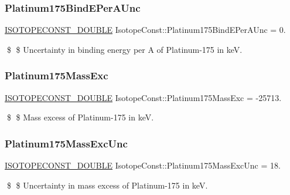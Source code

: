 \subsubsection{\texorpdfstring{Platinum175\+Bind\+E\+Per\+A\+Unc}{Platinum175BindEPerAUnc}}
{\footnotesize\ttfamily \mbox{\hyperlink{group___isotope_const-_macros_ga8f45a7272ce02c0b4c65c44636ed719a}{I\+S\+O\+T\+O\+P\+E\+C\+O\+N\+S\+T\+\_\+\+D\+O\+U\+B\+LE}} Isotope\+Const\+::\+Platinum175\+Bind\+E\+Per\+A\+Unc = 0.}

\$ \$ Uncertainty in binding energy per A of Platinum-\/175 in keV. \mbox{\label{group___isotope_const-_platinum-_pt175_ga0d008d732a6f93af9bc8bbce94d65a4e}} 
\subsubsection{\texorpdfstring{Platinum175\+Mass\+Exc}{Platinum175MassExc}}
{\footnotesize\ttfamily \mbox{\hyperlink{group___isotope_const-_macros_ga8f45a7272ce02c0b4c65c44636ed719a}{I\+S\+O\+T\+O\+P\+E\+C\+O\+N\+S\+T\+\_\+\+D\+O\+U\+B\+LE}} Isotope\+Const\+::\+Platinum175\+Mass\+Exc = -\/25713.}

\$ \$ Mass excess of Platinum-\/175 in keV. \mbox{\label{group___isotope_const-_platinum-_pt175_ga43a35c84ea98b8b3656f7dee6b037954}} 
\subsubsection{\texorpdfstring{Platinum175\+Mass\+Exc\+Unc}{Platinum175MassExcUnc}}
{\footnotesize\ttfamily \mbox{\hyperlink{group___isotope_const-_macros_ga8f45a7272ce02c0b4c65c44636ed719a}{I\+S\+O\+T\+O\+P\+E\+C\+O\+N\+S\+T\+\_\+\+D\+O\+U\+B\+LE}} Isotope\+Const\+::\+Platinum175\+Mass\+Exc\+Unc = 18.}

\$ \$ Uncertainty in mass excess of Platinum-\/175 in keV. \mbox{\label{group___isotope_const-_platinum-_pt175_ga496b82701af74c0e3d898491b6d155cf}} 
